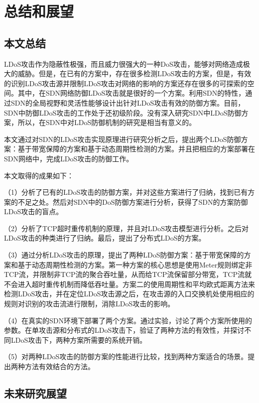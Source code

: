 \chapter{总结和展望}
\label{cha:conclusion}

\section{本文总结}
\label{chap6:conclusion}

LDoS攻击作为隐蔽性极强，而且威力很强大的一种DoS攻击，能够对网络造成极大的威胁。但是，在已有的方案中，存在很多检测LDoS攻击的方案，但是，有效的识别LDoS攻击源并限制LDoS攻击对网络的影响的方案还存在很多的可探索的空间。其中，在SDN网络防御LDoS攻击就是很好的一个方案。利用SDN的特性，通过SDN的全局视野和灵活性能够设计出针对LDoS攻击有效的防御方案。目前，SDN中防御LDoS攻击的工作处于还初级阶段。没有深入研究SDN中LDoS防御方案，所以，在SDN中对LDoS防御机制的研究是相当有意义的。

本文通过对SDN的LDoS攻击实现原理进行研究分析之后，提出两个LDoS防御方案：基于带宽保障的方案和基于动态周期性检测的方案。并且把相应的方案部署在SDN网络中，完成LDoS攻击的防御工作。

\noindent 本文取得的成果如下：

（1）分析了已有的LDoS攻击的防御方案，并对这些方案进行了归纳，找到已有方案的不足之处。然后对SDN中的DoS防御方案进行分析，获得了SDN的方案防御LDoS攻击的盲点。

（2）分析了TCP超时重传机制的原理，并且对LDoS攻击模型进行分析。之后对LDoS攻击的种类进行了归纳。最后，提出了分布式LDoS的方案。

（3）通过分析LDoS攻击的原理，提出了两种LDoS防御方案：基于带宽保障的方案和基于动态周期性检测的方案。第一种方案的核心思想是使用Meter规则绑定非TCP流，并限制非TCP流的聚合吞吐量，从而给TCP流保留部分带宽，TCP流就不会进入超时重传机制而降低吞吐量。方案二的使用周期性和平均欧式距离方法来检测LDoS攻击，并在定位LDoS攻击源之后，在攻击源的入口交换机处使用相应的规则对识别的攻击流进行限制，消除LDoS攻击的影响。

（4）在真实的SDN环境下部署了两个方案。通过实验，讨论了两个方案所使用的参数。在单攻击源和分布式的LDoS攻击下，验证了两种方法的有效性，并探讨不同LDoS攻击下，两种方案所需要的系统开销。

（5）对两种LDoS攻击的防御方案的性能进行比较，找到两种方案适合的场景。提出两种方法有效结合的方法。


\section{未来研究展望}
\label{chap6:expection}

